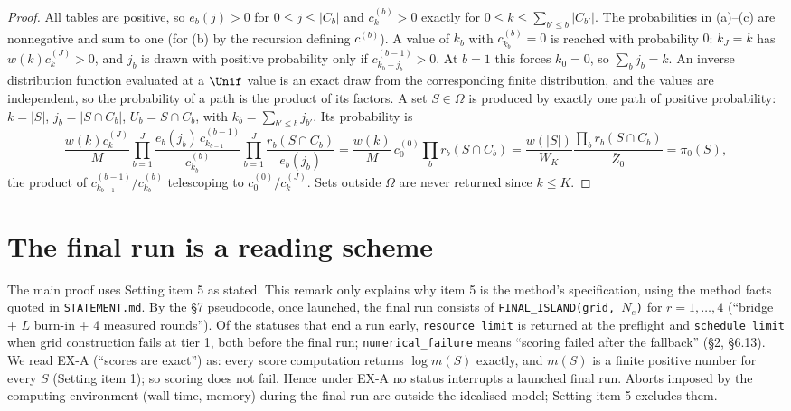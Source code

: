 \documentclass[11pt]{report}
\begin{document}
\begin{proof}
All tables are positive, so $e_b(j)>0$ for $0\le j\le|C_b|$ and $c^{(b)}_k>0$ exactly for
$0\le k\le\sum_{b'\le b}|C_{b'}|$. The probabilities in (a)--(c) are nonnegative and sum to one (for (b) by the
recursion defining $c^{(b)}$). A value of $k_b$ with $c^{(b)}_{k_b}=0$ is reached with probability $0$: $k_J=k$ has
$w(k)c^{(J)}_k>0$, and $j_b$ is drawn with positive probability only if $c^{(b-1)}_{k_b-j_b}>0$. At $b=1$ this forces
$k_0=0$, so $\sum_bj_b=k$. An inverse distribution function evaluated at a $\Unif$ value is an exact draw from the
corresponding finite distribution, and the values are independent, so the probability of a path is the product of
its factors. A set $S\in\Omega$ is produced by exactly one path of positive probability: $k=|S|$, $j_b=|S\cap C_b|$, $U_b=S\cap C_b$, with
$k_b=\sum_{b'\le b}j_{b'}$. Its probability is
\[
\frac{w(k)c^{(J)}_k}{M}\prod_{b=1}^J\frac{e_b(j_b)\,c^{(b-1)}_{k_{b-1}}}{c^{(b)}_{k_b}}
\prod_{b=1}^J\frac{r_b(S\cap C_b)}{e_b(j_b)}
=\frac{w(k)}{M}\,c^{(0)}_{0}\prod_b r_b(S\cap C_b)
=\frac{w(|S|)}{W_K}\frac{\prod_b r_b(S\cap C_b)}{\bar Z_0}=\pi_0(S),
\]
the product of $c^{(b-1)}_{k_{b-1}}/c^{(b)}_{k_b}$ telescoping to $c^{(0)}_0/c^{(J)}_k$. Sets outside $\Omega$ are never
returned since $k\le K$.
\end{proof}

\section{The final run is a reading scheme}

\begin{T11remark}\label{T11:rem:full}
The main proof uses Setting item 5 as stated. This remark only explains why item 5 is the method's specification,
using the method facts quoted in \texttt{STATEMENT.md}. By the \S7 pseudocode, once launched, the final run consists of
\texttt{FINAL\_ISLAND(grid, $N_e$)} for $r=1,\dots,4$ (``bridge + $L$ burn-in + 4 measured rounds''). Of the statuses
that end a run early, \texttt{resource\_limit} is returned at the preflight and \texttt{schedule\_limit} when grid
construction fails at tier 1, both before the final run; \texttt{numerical\_failure} means ``scoring failed after the
fallback'' (\S2, \S6.13). We read EX-A (``scores are exact'') as: every score computation returns
$\log m(S)$ exactly, and $m(S)$ is a finite positive number for every $S$ (Setting item 1); so scoring does not fail. Hence under EX-A no status interrupts a launched final run.
Aborts imposed by the computing environment (wall time, memory) during the final run are outside the idealised model;
Setting item 5 excludes them.
\end{T11remark}
\end{document}
